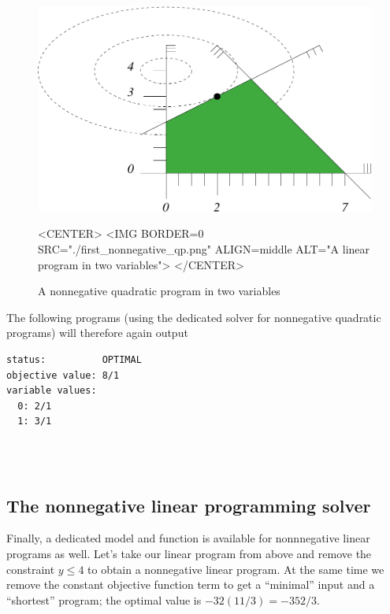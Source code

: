 \begin{figure}[htbp]
\begin{ccTexOnly}
\begin{center}
\includegraphics{QP_solver/first_nonnegative_qp} 
\end{center}
\end{ccTexOnly}

\begin{ccHtmlOnly}
<CENTER>
<IMG BORDER=0 SRC="./first_nonnegative_qp.png" ALIGN=middle ALT="A linear program in two variables">
</CENTER>
\end{ccHtmlOnly}

\caption{A nonnegative quadratic program in two variables
\label{fig:QP-first_nonnegative_qp}}
\end{figure}

The following programs (using the dedicated solver for nonnegative
quadratic programs) will therefore again output
\begin{verbatim}
status:          OPTIMAL
objective value: 8/1
variable values:
  0: 2/1
  1: 3/1
\end{verbatim}

\\
\\

\subsection{The nonnegative linear programming solver}
Finally, a dedicated model and function is available for nonnnegative linear
programs as well. Let's take our linear program from above and remove
the constraint $y\leq 4$ to obtain a nonnegative linear program. At
the same time we remove the constant objective function term to get
a ``minimal'' input and a ``shortest'' program; the optimal value is
$-32(11/3)=-352/3$.


